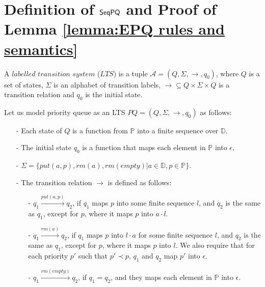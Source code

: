\section{Definition of $\mathsf{SeqPQ}$ and Proof of Lemma \ref{lemma:EPQ rules and semantics}}
\label{sec:appendix definition of seqPQ and proof of Lemma EQP rules and semantics}

A $\textit{labelled transition system}$ ($LTS$) is a tuple $\mathcal{A}=(Q,\Sigma,\rightarrow,q_0)$, where $Q$ is a set of states, $\Sigma$ is an alphabet of transition labels, $\rightarrow\subseteq Q\times\Sigma\times Q$ is a transition relation and $q_0$ is the initial state.

Let us model priority queue as an LTS $\textit{PQ} = (Q,\Sigma,\rightarrow,q_0)$ as follows:

\begin{itemize}
\setlength{\itemsep}{0.5pt}
\item[-] Each state of $Q$ is a function from $\mathbb{P}$ into a finite sequence over $\mathbb{D}$.

\item[-] The initial state $q_0$ is a function that maps each element in $\mathbb{P}$ into $\epsilon$.

\item[-] $\Sigma = \{ \textit{put}(a,p),\textit{rm}(a),\textit{rm}(\textit{empty}) \vert a \in \mathbb{D}, p \in \mathbb{P} \}$.

\item[-] The transition relation $\rightarrow$ is defined as follows:

    \begin{itemize}
    \setlength{\itemsep}{0.5pt}
    \item[-] $q_1 \xrightarrow{\textit{put}(a,p)} q_2$, if $q_1$ maps $p$ into some finite sequence $l$, and $q_2$ is the same as $q_1$, except for $p$, where it maps $p$ into $a \cdot l$.

    \item[-] $q_1 \xrightarrow{\textit{rm}(a)} q_2$, if $q_1$ maps $p$ into $l \cdot a$ for some finite sequence $l$, and $q_2$ is the same as $q_1$, except for $p$, where it maps $p$ into $l$. We also require that for each priority $p'$ such that $p' \prec p$, $q_1$ and $q_2$ map $p'$ into $\epsilon$.

    \item[-] $q_1 \xrightarrow{\textit{rm}(\textit{empty})} q_2$, if $q_1 = q_2$, and they maps each element in $\mathbb{P}$ into $\epsilon$.
    \end{itemize}
\end{itemize}

